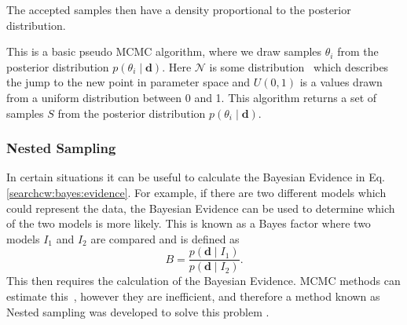 The accepted samples then have a density proportional to the posterior distribution. 
%
\begin{algorithm}
	\centering
	\begin{algorithmic}[1]
		 
		 
		\STATE
		
			\ELSE
				\ELSE
				\ENDIF
		\ENDIF
		\ENDFOR
		\STATE

	\end{algorithmic}
        \caption[Simple MCMC algorithm]{This is a basic pseudo MCMC algorithm,
where we draw samples $\theta_i$ from the posterior distribution $p(\theta_i
\mid \bm{d})$. Here $\mathcal{N}$ is some distribution~ which describes the jump
to the new point in parameter space and $U(0,1)$ is a values drawn from a
uniform distribution between 0 and 1. This algorithm returns a set of samples
$S$ from the posterior distribution $p(\theta_i \mid \bm{d})$.
\label{searchcw:bayes:mcmc_alg}}

\end{algorithm}

%
\subsubsection{\label{searchcw:prob:bayes:nested}Nested Sampling}
%

In certain situations it can be useful to calculate the Bayesian Evidence in Eq.\ref{searchcw:bayes:evidence}.  For example, if there are two
different models which could represent the data, the Bayesian Evidence can be used to
determine which of the two models is more likely.  This is known as a Bayes
factor where two models $I_1$ and $I_2$ are compared and is defined as
%
\begin{equation}
B = \frac{p({\bm d} \mid I_1)}{p({\bm d} \mid I_2)}.
\end{equation}
%
This then requires the calculation of the
Bayesian Evidence. \gls{MCMC} methods can estimate this~, however they are inefficient, and therefore a method known as Nested
sampling was developed to solve this problem
\citep{skilling2006NestedSampling,speagle2019DynestyDynamic}.~

